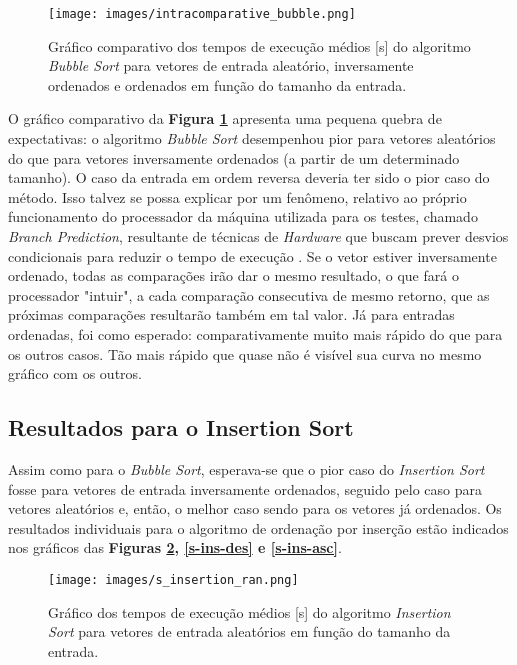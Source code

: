 \documentclass[fontsize=10pt]{article}
\begin{document}
\begin{figure}[H]
\centering
\texttt{[image: images/intracomparative\_bubble.png]}
\caption{Gráfico comparativo dos tempos de execução médios [s] do algoritmo \textit{Bubble Sort} para vetores de entrada aleatório, inversamente ordenados e ordenados em função do tamanho da entrada.}
\label{intracomp-bub}
\end{figure}

O gráfico comparativo da \textbf{Figura \ref{intracomp-bub}} apresenta uma pequena quebra de expectativas: o algoritmo \textit{Bubble Sort} desempenhou pior para vetores aleatórios do que para vetores inversamente ordenados (a partir de um determinado tamanho). O caso da entrada em ordem reversa deveria ter sido o pior caso do método. Isso talvez se possa explicar por um fenômeno, relativo ao próprio funcionamento do processador da máquina utilizada para os testes, chamado \textit{Branch Prediction}, resultante de técnicas de \textit{Hardware} que buscam prever desvios condicionais para reduzir o tempo de execução \cite{ccc}. Se o vetor estiver inversamente ordenado, todas as comparações irão dar o mesmo resultado, o que fará o processador "intuir", a cada comparação consecutiva de mesmo retorno, que as próximas comparações resultarão também em tal valor. Já para entradas ordenadas, foi como esperado: comparativamente muito mais rápido do que para os outros casos. Tão mais rápido que quase não é visível sua curva no mesmo gráfico com os outros.

\subsection{Resultados para o Insertion Sort}

Assim como para o \textit{Bubble Sort}, esperava-se que o pior caso do \textit{Insertion Sort} fosse para vetores de entrada inversamente ordenados, seguido pelo caso para vetores aleatórios e, então, o melhor caso sendo para os vetores já ordenados. Os resultados individuais para o algoritmo de ordenação por inserção estão indicados nos gráficos das \textbf{Figuras \ref{s-ins-ran}, \ref{s-ins-des} e \ref{s-ins-asc}}.

\begin{figure}[H]
\centering
\texttt{[image: images/s\_insertion\_ran.png]}
\caption{Gráfico dos tempos de execução médios [s] do algoritmo \textit{Insertion Sort} para vetores de entrada aleatórios em função do tamanho da entrada.}
\label{s-ins-ran}
\end{figure}
\end{document}
